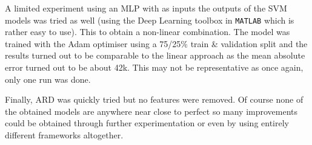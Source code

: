 \par A limited experiment using an MLP with as inputs the outputs of the SVM models was tried as well (using the Deep Learning toolbox in \texttt{MATLAB} which is rather easy to use). This to obtain a non-linear combination. The model was trained with the Adam optimiser using a 75/25\% train \& validation split and the results turned out to be comparable to the linear approach as the mean absolute error turned out to be about 42k. This may not be representative as once again, only one run was done.

\par Finally, ARD was quickly tried but no features were removed. Of course none of the obtained models are anywhere near close to perfect so many improvements could be obtained through further experimentation or even by using entirely different frameworks altogether. 

\endgroup

